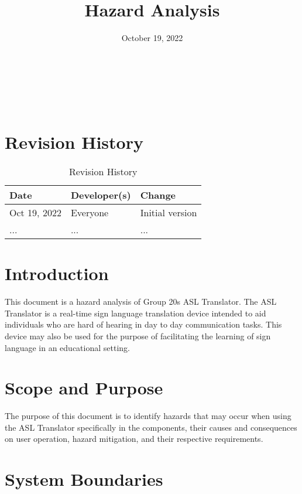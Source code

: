 \documentclass{article}
\title{Hazard Analysis\\\progname}
\author{\authname}
\date{October 19, 2022}
\begin{document}
\maketitle

~\newpage

\tableofcontents
\listoftables

~\newpage

\section*{Revision History}
\begin{table}[hp]
\caption{Revision History} \label{TblRevisionHistory}
\begin{tabularx}{\textwidth}{llX}
\toprule
\textbf{Date} & \textbf{Developer(s)} & \textbf{Change}\\
\midrule
Oct 19, 2022 & Everyone & Initial version\\

... & ... & ...\\
\bottomrule
\end{tabularx}
\end{table}

\newpage
\textheight 9in

\section{Introduction}

This document is a hazard analysis of Group 20\textquotesingle s ASL Translator. The ASL Translator is a real-time sign language translation device intended to aid 
individuals who are hard of hearing in day to day communication tasks. This device may also be used for the purpose of facilitating the learning of 
sign language in an educational setting.\\

\section{Scope and Purpose}

The purpose of this document is to identify hazards that may occur when using the ASL Translator specifically in the components, their causes and consequences on user 
operation, hazard mitigation, and their respective requirements.\\

\section{System Boundaries}
\end{document}
